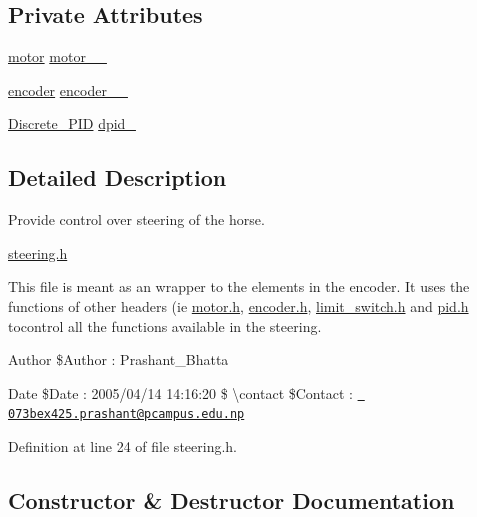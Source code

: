 \subsection*{Private Attributes}
\begin{DoxyCompactItemize}
\item 
\mbox{\hyperlink{classmotor}{motor}} \mbox{\hyperlink{classsteering_ae6f1468c34059bfeecec645f6a51971a}{motor\+\_\+\+\_\+}}
\item 
\mbox{\hyperlink{classencoder}{encoder}} \mbox{\hyperlink{classsteering_a59f627a3b0b3cbb4ee083c3233ea6640}{encoder\+\_\+\+\_\+}}
\item 
\mbox{\hyperlink{class_discrete___p_i_d}{Discrete\+\_\+\+P\+ID}} \mbox{\hyperlink{classsteering_aa5188aeac7c2173f1663aacd830b088c}{dpid\+\_\+}}
\end{DoxyCompactItemize}


\subsection{Detailed Description}
Provide control over steering of the horse. 

\mbox{\hyperlink{steering_8h}{steering.\+h}}

This file is meant as an wrapper to the elements in the encoder. It uses the functions of other headers (ie \mbox{\hyperlink{motor_8h}{motor.\+h}}, \mbox{\hyperlink{encoder_8h}{encoder.\+h}}, \mbox{\hyperlink{limit__switch_8h}{limit\+\_\+switch.\+h}} and \mbox{\hyperlink{pid_8h}{pid.\+h}} tocontrol all the functions available in the steering.

\begin{DoxyAuthor}{Author}
\$\+Author \+: Prashant\+\_\+\+Bhatta 
\end{DoxyAuthor}
\begin{DoxyDate}{Date}
\$\+Date \+: 2005/04/14 14\+:16\+:20 \$ \textbackslash{}contact \$\+Contact \+: \href{mailto:073bex425.prashant@pcampus.edu.np}{\texttt{ 073bex425.\+prashant@pcampus.\+edu.\+np}} 
\end{DoxyDate}


Definition at line 24 of file steering.\+h.



\subsection{Constructor \& Destructor Documentation}
\mbox{\label{classsteering_a55383df3b5eb0bbd66cd9ef76c82b588}} 
